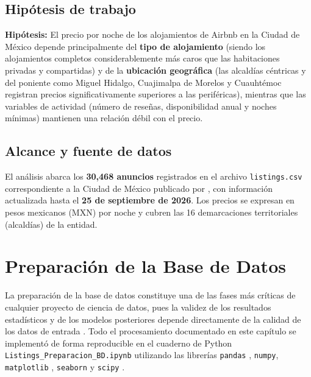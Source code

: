 \documentclass[12pt,letterpaper,oneside]{report}
\begin{document}
\section{Hipótesis de trabajo}

\begin{tcolorbox}[colback=LightBg, colframe=NavyPrimary, arc=2pt, boxrule=0.7pt]
\textbf{Hipótesis:} El precio por noche de los alojamientos de Airbnb en la Ciudad de México depende principalmente del \textbf{tipo de alojamiento} (siendo los alojamientos completos considerablemente más caros que las habitaciones privadas y compartidas) y de la \textbf{ubicación geográfica} (las alcaldías céntricas y del poniente como Miguel Hidalgo, Cuajimalpa de Morelos y Cuauhtémoc registran precios significativamente superiores a las periféricas), mientras que las variables de actividad (número de reseñas, disponibilidad anual y noches mínimas) mantienen una relación débil con el precio.
\end{tcolorbox}

\section{Alcance y fuente de datos}

El análisis abarca los \textbf{30,468 anuncios} registrados en el archivo \texttt{listings.csv} correspondiente a la Ciudad de México publicado por \citet{insideairbnb2026}, con información actualizada hasta el \textbf{25 de septiembre de 2026}. Los precios se expresan en pesos mexicanos (MXN) por noche y cubren las 16 demarcaciones territoriales (alcaldías) de la entidad.

\chapter{Preparación de la Base de Datos}
\label{cap:cap2}

La preparación de la base de datos constituye una de las fases más críticas de cualquier proyecto de ciencia de datos, pues la validez de los resultados estadísticos y de los modelos posteriores depende directamente de la calidad de los datos de entrada \citep{chapman2000crispdm,garcia2015data}. Todo el procesamiento documentado en este capítulo se implementó de forma reproducible en el cuaderno de Python \texttt{Listings\_Preparacion\_BD.ipynb} utilizando las librerías \texttt{pandas} \citep{mckinney2022python}, \texttt{numpy}, \texttt{matplotlib} \citep{hunter2007matplotlib}, \texttt{seaborn} \citep{waskom2021seaborn} y \texttt{scipy} \citep{virtanen2020scipy}.
\end{document}
